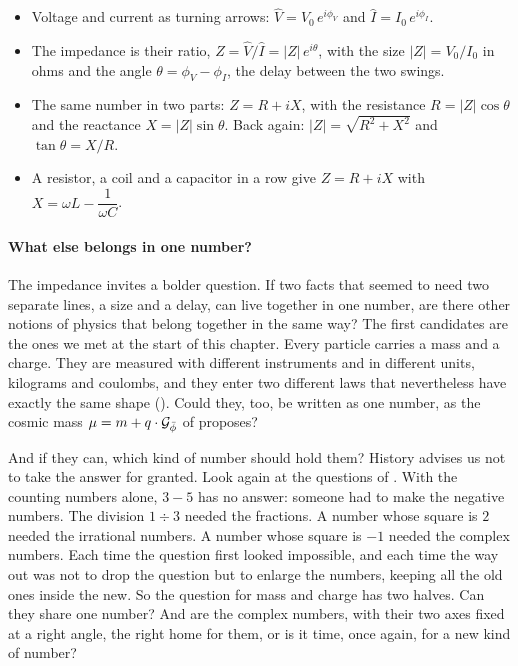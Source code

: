 \begin{plainwords}
\begin{itemize}
  \item Voltage and current as turning arrows: $\hat{V} = V_0\,e^{i\phi_V}$ and $\hat{I} = I_0\,e^{i\phi_I}$.
  \item The impedance is their ratio, $Z = \hat{V}/\hat{I} = |Z|\,e^{i\theta}$, with the size $|Z| = V_0/I_0$ in ohms and the angle $\theta = \phi_V - \phi_I$, the delay between the two swings.
  \item The same number in two parts: $Z = R + iX$, with the resistance $R = |Z|\cos\theta$ and the reactance $X = |Z|\sin\theta$. Back again: $|Z| = \sqrt{R^2 + X^2}$ and $\tan\theta = X/R$.
  \item A resistor, a coil and a capacitor in a row give $Z = R + iX$ with $X = \omega L - \dfrac{1}{\omega C}$.
\end{itemize}
\end{plainwords}

\paragraph{What else belongs in one number?}
The impedance invites a bolder question. If two facts that seemed to need two separate lines, a size and a delay, can live together in one number, are there other notions of physics that belong together in the same way? The first candidates are the ones we met at the start of this chapter. Every particle carries a mass and a charge. They are measured with different instruments and in different units, kilograms and coulombs, and they enter two different laws that nevertheless have exactly the same shape (). Could they, too, be written as one number, as the cosmic mass $\mu = m + q \cdot \mathcal{G}_{\bar{\phi}}$ of  proposes?

And if they can, which kind of number should hold them? History advises us not to take the answer for granted. Look again at the questions of . With the counting numbers alone, $3 - 5$ has no answer: someone had to make the negative numbers. The division $1 \div 3$ needed the fractions. A number whose square is $2$ needed the irrational numbers. A number whose square is $-1$ needed the complex numbers. Each time the question first looked impossible, and each time the way out was not to drop the question but to enlarge the numbers, keeping all the old ones inside the new. So the question for mass and charge has two halves. Can they share one number? And are the complex numbers, with their two axes fixed at a right angle, the right home for them, or is it time, once again, for a new kind of number?



